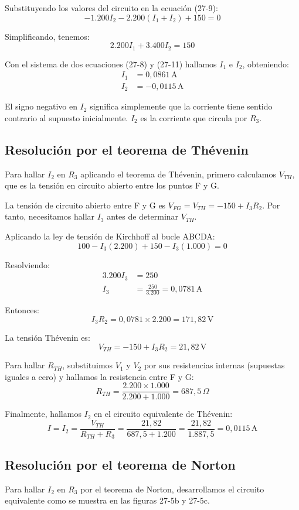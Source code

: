 Substituyendo los valores del circuito en la ecuación (27-9):
\[
- 1.200I_2 - 2.200(I_1 + I_2) + 150 = 0
\tag{27-10}
\]

Simplificando, tenemos:
\[
2.200I_1 + 3.400I_2 = 150
\tag{27-11}
\]

Con el sistema de dos ecuaciones (27-8) y (27-11) hallamos $I_1$ e $I_2$, obteniendo:
\[
\begin{aligned}
I_1 &= 0,0861 \, \text{A} \\
I_2 &= -0,0115 \, \text{A}
\end{aligned}
\]

El signo negativo en $I_2$ significa simplemente que la corriente tiene sentido contrario al supuesto inicialmente. $I_2$ es la corriente que circula por $R_3$.

\subsection{Resolución por el teorema de Thévenin}
Para hallar $I_2$ en $R_3$ aplicando el teorema de Thévenin, primero calculamos $V_{TH}$, que es la tensión en circuito abierto entre los puntos F y G.

La tensión de circuito abierto entre F y G es $V_{FG} = V_{TH} = -150 + I_3R_2$. Por tanto, necesitamos hallar $I_3$ antes de determinar $V_{TH}$.

Aplicando la ley de tensión de Kirchhoff al bucle ABCDA:
\[
100 - I_3(2.200) + 150 - I_3(1.000) = 0
\tag{27-12}
\]

Resolviendo:
\[
\begin{aligned}
3.200I_3 &= 250 \\
I_3 &= \frac{250}{3.200} = 0,0781 \, \text{A}
\end{aligned}
\]

Entonces:
\[
I_3R_2 = 0,0781 \times 2.200 = 171,82 \, \text{V}
\]

La tensión Thévenin es:
\[
V_{TH} = -150 + I_3R_2 = 21,82 \, \text{V}
\tag{27-13}
\]

Para hallar $R_{TH}$, substituimos $V_1$ y $V_2$ por sus resistencias internas (supuestas iguales a cero) y hallamos la resistencia entre F y G:
\[
R_{TH} = \frac{2.200 \times 1.000}{2.200 + 1.000} = 687,5 \, \Omega
\tag{27-14}
\]

Finalmente, hallamos $I_2$ en el circuito equivalente de Thévenin:
\[
I = I_2 = \frac{V_{TH}}{R_{TH} + R_3} = \frac{21,82}{687,5 + 1.200} = \frac{21,82}{1.887,5} = 0,0115 \, \text{A}
\tag{27-15}
\]

\subsection{Resolución por el teorema de Norton}
Para hallar $I_2$ en $R_3$ por el teorema de Norton, desarrollamos el circuito equivalente como se muestra en las figuras 27-5b y 27-5c.

